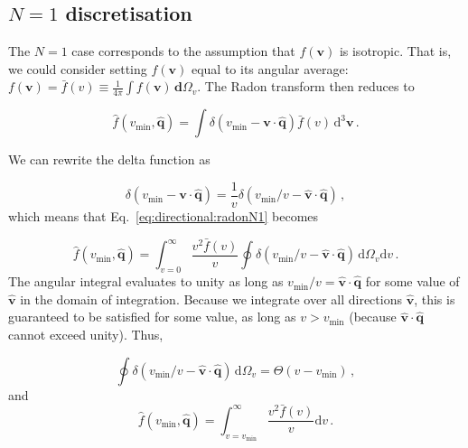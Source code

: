 
\subsection{$N=1$ discretisation}

The $N=1$ case corresponds to the assumption that $f(\textbf{v})$ is isotropic. That is, we could consider setting $f(\textbf{v})$ equal to its angular average:  $f(\textbf{v}) = \bar{f}(v) \equiv \frac{1}{4\pi} \int f(\textbf{v}) \, \mathbf{d}\Omega_v$. The Radon transform then reduces to

\begin{equation}
\label{eq:directional:radonN1}
\hat{f}\left(v_\textrm{min},\hat{\textbf{q}}\right) = \int \delta\left(v_\textrm{min} - \textbf{v}\cdot\hat{\textbf{q}}\right) \bar{f}(v) \,\textrm{d}^3\textbf{v}\,.
\end{equation}

We can rewrite the delta function as

\begin{equation}
\delta\left(v_\textrm{min} - \textbf{v}\cdot\hat{\textbf{q}}\right) = \frac{1}{v}\delta(v_\textrm{min}/v - \hat{\textbf{v}}\cdot\hat{\textbf{q}})\,, 
\end{equation}
which means that Eq.~\ref{eq:directional:radonN1} becomes  

\begin{equation}
\hat{f}\left(v_\textrm{min},\hat{\textbf{q}}\right) = \int_{v=0}^\infty \frac{v^2\bar{f}(v)}{v} \oint \delta\left(v_\textrm{min}/v - \hat{\textbf{v}}\cdot\hat{\textbf{q}}\right)  \, \mathrm{d}\Omega_v\mathrm{d}v\,.
\end{equation}
The angular integral evaluates to unity as long as $v_\textrm{min}/v = \hat{\textbf{v}}\cdot\hat{\textbf{q}}$ for some value of $\hat{\textbf{v}}$ in the domain of integration. Because we integrate over all directions $\hat{\textbf{v}}$, this is guaranteed to be satisfied for some value, as long as $v > v_\textrm{min}$ (because $\hat{\textbf{v}}\cdot\hat{\textbf{q}}$ cannot exceed unity). Thus,

\begin{equation}
\oint \delta\left(v_\textrm{min}/v - \hat{\textbf{v}}\cdot\hat{\textbf{q}}\right)  \, \mathrm{d}\Omega_v = \Theta(v - v_\textrm{min})\,,
\end{equation}
and
\begin{equation}
\hat{f}\left(v_\textrm{min},\hat{\textbf{q}}\right) = \int_{v=v_\textrm{min}}^\infty \frac{v^2\bar{f}(v)}{v} \mathrm{d}v\,.
\end{equation}

